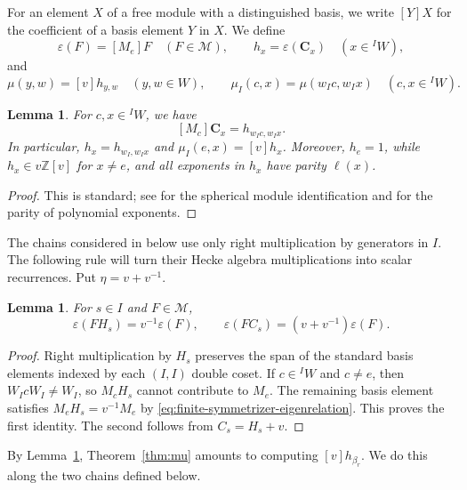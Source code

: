 \documentclass[11pt,a4paper,reqno]{amsart}
\numberwithin{equation}{section}
\newtheorem{lemma}[theorem]{Lemma}
\theoremstyle{definition}
\theoremstyle{remark}
\theoremstyle{plain}
\newcommand{\C}{\mathbf C}
\newcommand{\M}{\mathcal M}
\newcommand{\eps}{\varepsilon}
\newcommand{\mus}{\mu_I}
\begin{document}
For an element $X$ of a free module with a distinguished basis, we write $[Y]X$ for the coefficient of a basis element $Y$ in $X$.
We define
\[
 \eps(F)=[M_e]F \quad(F\in\M),\qquad h_x=\eps(\C_x) \quad (x\in{}^I W),
\]
and
\begin{equation}\label{eq:mu-definition}
 \mu(y,w)=[v]h_{y,w}\quad(y,w\in W),\qquad
 \mus(c,x)=\mu(w_Ic,w_Ix)\quad(c,x\in{}^I W).
\end{equation}

{\color{black}
\begin{lemma}\label{lem:mu}
For $c,x\in{}^I W$, we have
\[
[M_c]\C_x=h_{w_Ic,w_Ix}.
\]
In particular, $h_x=h_{w_I,w_Ix}$ and
$\mus(e,x)=[v]h_x$.
Moreover, $h_e=1$, while $h_x\in v\mathbb Z[v]$ for $x\ne e$,
and all exponents in $h_x$ have parity $\ell(x)$.
\end{lemma}
}
\begin{proof}\color{black}
This is standard; see    \cite[Theorem 3.1 \& Proposition 3.4]{Soergel} for the spherical module identification and  \cite{KL}  for the parity of polynomial exponents. \end{proof}


The chains considered in  below use only right multiplication by
generators in $I$.
The following rule will turn their Hecke algebra multiplications into scalar recurrences.
Put $\eta=v+v^{-1}$.

\begin{lemma}\label{lem:scalar}
For $s\in I$ and $F\in\M$,
\begin{equation}\label{eq:scalar}
 \eps(FH_s)=v^{-1}\eps(F),\qquad
 \eps(FC_s)=(v+v^{-1})\eps(F).
\end{equation}
\end{lemma}
\begin{proof}
Right multiplication by $H_s$ preserves the span of the standard
basis elements indexed by each $(I,I)$ double coset. If
$c\in{}^I W$ and $c\ne e$, then $W_IcW_I\ne W_I$, so $M_cH_s$
cannot contribute to $M_e$. The remaining basis element satisfies
$M_eH_s=v^{-1}M_e$ by
\eqref{eq:finite-symmetrizer-eigenrelation}. This proves the first
identity. 
The second follows from $C_s=H_s+v$.
\end{proof}

By Lemma~\ref{lem:mu}, Theorem~\ref{thm:mu} amounts to computing
$[v]h_{\beta_r}$. We do this along the two chains defined below.
\end{document}
